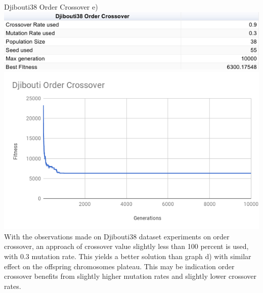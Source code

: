 \documentclass[conference]{IEEEtran}
\begin{document}
Djibouti38 Order Crossover e)
\includegraphics[scale=0.42]{Djibouti38/OC/Djibouti38_OC_e)_table}
\includegraphics[scale=0.42]{Djibouti38/OC/Djibouti38_OC_e)}
With the observations made on Djibouti38 dataset experiments on order crossover, an approach of crossover value slightly less than 100 percent is used, with 0.3 mutation rate. This yields a better solution than graph d) with similar effect on the offspring chromosomes plateau. This may be indication order crossover benefits from slightly higher mutation rates and slightly lower crossover rates.
%
%
\end{document}

